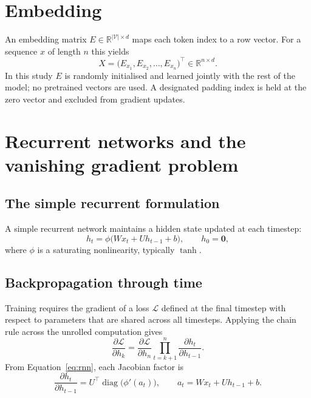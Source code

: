 \section{Embedding}

An embedding matrix $E \in \mathbb{R}^{|\mathcal{V}| \times d}$ maps each token index to a row
vector. For a sequence $x$ of length $n$ this yields
\begin{equation}
X = \big(E_{x_1}, E_{x_2}, \dots, E_{x_n}\big)^{\!\top} \in \mathbb{R}^{n \times d}.
\end{equation}
In this study $E$ is randomly initialised and learned jointly with the rest of the model; no
pretrained vectors are used. A designated padding index is held at the zero vector and excluded
from gradient updates.

\section{Recurrent networks and the vanishing gradient problem}
\label{sec:vanishing}

\subsection{The simple recurrent formulation}

A simple recurrent network maintains a hidden state updated at each timestep:
\begin{equation}
h_t = \phi\big(W x_t + U h_{t-1} + b\big), \qquad h_0 = \mathbf{0},
\label{eq:rnn}
\end{equation}
where $\phi$ is a saturating nonlinearity, typically $\tanh$.

\subsection{Backpropagation through time}

Training requires the gradient of a loss $\mathcal{L}$ defined at the final timestep with respect
to parameters that are shared across all timesteps. Applying the chain rule across the unrolled
computation gives
\begin{equation}
\frac{\partial \mathcal{L}}{\partial h_k}
  = \frac{\partial \mathcal{L}}{\partial h_n}
    \prod_{t=k+1}^{n} \frac{\partial h_t}{\partial h_{t-1}} .
\label{eq:bptt}
\end{equation}
From Equation~\ref{eq:rnn}, each Jacobian factor is
\begin{equation}
\frac{\partial h_t}{\partial h_{t-1}}
  = U^{\!\top} \operatorname{diag}\!\big(\phi'(a_t)\big),
  \qquad a_t = W x_t + U h_{t-1} + b .
\end{equation}

